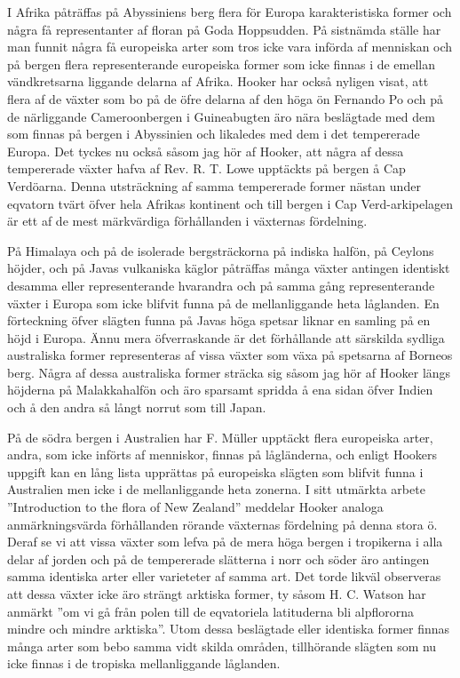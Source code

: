 I Afrika påträffas på Abyssiniens berg flera för Europa karakteristiska former och några få representanter af floran på Goda Hoppsudden. På sistnämda ställe har man funnit några få europeiska arter som tros icke vara införda af menniskan och på bergen flera representerande europeiska former som icke finnas i de emellan vändkretsarna liggande delarna af Afrika. Hooker har också nyligen visat, att flera af de växter som bo på de öfre delarna af den höga ön Fernando Po och på de närliggande Cameroonbergen i Guineabugten äro nära beslägtade med dem som finnas på bergen i Abyssinien och likaledes med dem i det tempererade Europa. Det tyckes nu också såsom jag hör af Hooker, att några af dessa tempererade växter hafva af Rev. R. T. Lowe upptäckts på bergen å Cap Verdöarna. Denna utsträckning af samma tempererade former nästan under eqvatorn tvärt öfver hela Afrikas kontinent och till bergen i Cap Verd-arkipelagen är ett af de mest märkvärdiga förhållanden i växternas fördelning.

På Himalaya och på de isolerade bergsträckorna på indiska halfön, på Ceylons höjder, och på Javas vulkaniska käglor påträffas många växter antingen identiskt desamma eller representerande hvarandra och på samma gång representerande växter i Europa som icke blifvit funna på de mellanliggande heta låglanden. En förteckning öfver slägten funna på Javas höga spetsar liknar en samling på en höjd i Europa. Ännu mera öfverraskande är det förhållande att särskilda sydliga australiska former representeras af vissa växter som växa på spetsarna af Borneos berg. Några af dessa australiska former sträcka sig såsom jag hör af Hooker längs höjderna på Malakkahalfön och äro sparsamt spridda å ena sidan öfver Indien och å den andra så långt norrut som till Japan.

På de södra bergen i Australien har F. Müller upptäckt flera europeiska arter, andra, som icke införts af menniskor, finnas på lågländerna, och enligt Hookers uppgift kan en lång lista upprättas på europeiska slägten som blifvit funna i Australien men icke i de mellanliggande heta zonerna. I sitt utmärkta arbete ”Introduction to the flora of New Zealand” meddelar Hooker analoga anmärkningsvärda förhållanden rörande växternas fördelning på denna stora ö. Deraf se vi att vissa växter som lefva på de mera höga bergen i tropikerna i alla delar af jorden och på de tempererade slätterna i norr och söder äro antingen samma identiska arter eller varieteter af samma art. Det torde likväl observeras att dessa växter icke äro strängt arktiska former, ty såsom H. C. Watson har anmärkt ”om vi gå från polen till de eqvatoriela latituderna bli alpflororna mindre och mindre arktiska”. Utom dessa beslägtade eller identiska former finnas många arter som bebo samma vidt skilda områden, tillhörande slägten som nu icke finnas i de tropiska mellanliggande låglanden.

